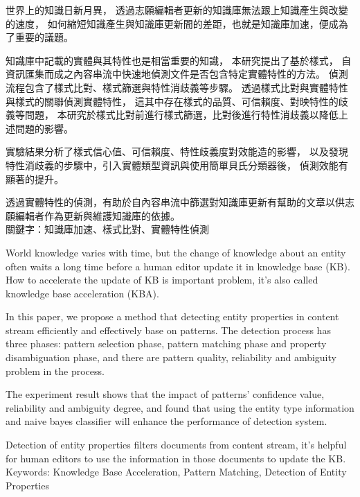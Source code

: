 \begin{abstractzh}

世界上的知識日新月異，
透過志願編輯者更新的知識庫無法跟上知識產生與改變的速度，
如何縮短知識產生與知識庫更新間的差距，也就是知識庫加速，便成為了重要的議題。

知識庫中記載的實體與其特性也是相當重要的知識，
本研究提出了基於樣式，
自資訊匯集而成之內容串流中快速地偵測文件是否包含特定實體特性的方法。
偵測流程包含了樣式比對、樣式篩選與特性消歧義等步驟。
透過樣式比對與實體特性與樣式的關聯偵測實體特性，
這其中存在樣式的品質、可信賴度、對映特性的歧義等問題，
本研究於樣式比對前進行樣式篩選，比對後進行特性消歧義以降低上述問題的影響。

實驗結果分析了樣式信心值、可信賴度、特性歧義度對效能造的影響，
以及發現特性消歧義的步驟中，引入實體類型資訊與使用簡單貝氏分類器後，
偵測效能有顯著的提升。

透過實體特性的偵測，有助於自內容串流中篩選對知識庫更新有幫助的文章以供志願編輯者作為更新與維護知識庫的依據。\\

\noindent
關鍵字：知識庫加速、樣式比對、實體特性偵測

\end{abstractzh}

\begin{abstracten}

World knowledge varies with time, 
but the change of knowledge about an entity often waits 
a long time before a human editor update it in knowledge base (KB).
How to accelerate the update of KB is important problem, 
it's also called knowledge base acceleration (KBA).

In this paper, we propose a method that detecting entity properties 
in content stream efficiently and effectively base on patterns. 
The detection process has three phases: 
pattern selection phase, pattern matching phase and 
property disambiguation phase, 
and there are pattern quality, 
reliability and ambiguity problem in the process. 

The experiment result shows that the impact of patterns' confidence value, reliability
and ambiguity degree, 
and found that using the entity type information and naive bayes classifier will enhance the performance of detection system.

Detection of entity properties filters documents from content stream,
it's helpful for human editors to use the information in those documents to update the KB.\\


\noindent
Keywords: Knowledge Base Acceleration, Pattern Matching, Detection of Entity Properties
\end{abstracten}

